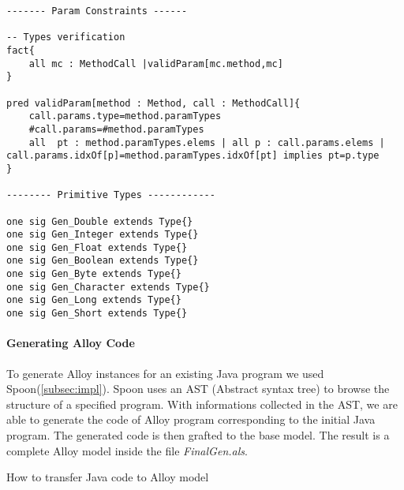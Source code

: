 \begin{lstlisting}
------- Param Constraints ------

-- Types verification 
fact{
    all mc : MethodCall |validParam[mc.method,mc]
}

pred validParam[method : Method, call : MethodCall]{
	call.params.type=method.paramTypes
	#call.params=#method.paramTypes
    all  pt : method.paramTypes.elems | all p : call.params.elems | call.params.idxOf[p]=method.paramTypes.idxOf[pt] implies pt=p.type
}

-------- Primitive Types ------------

one sig Gen_Double extends Type{}
one sig Gen_Integer extends Type{}
one sig Gen_Float extends Type{}
one sig Gen_Boolean extends Type{}
one sig Gen_Byte extends Type{}
one sig Gen_Character extends Type{}
one sig Gen_Long extends Type{}
one sig Gen_Short extends Type{}
\end{lstlisting}

\paragraph{Generating Alloy Code}
To generate Alloy instances for an existing Java program we used Spoon(\ref{subsec:impl}). Spoon uses an AST (Abstract syntax tree)\cite{ast} to browse the structure of a specified program. With informations collected in the AST, we are able to generate the code of Alloy program corresponding to the initial Java program. The generated code is then grafted to the base model.
The result is a complete Alloy model inside the file \textit{FinalGen.als}.\\

\begin{algorithm}[H]
\SetAlgoLined
{}
\caption{How to transfer Java code to Alloy model}
\end{algorithm}
\bigskip
\bigskip

